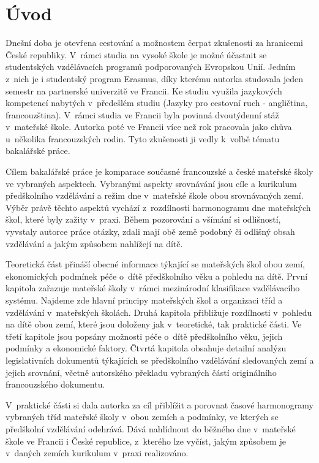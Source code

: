 \setcounter{page}{1}
\chapter*{Úvod}
Dnešní doba je otevřena cestování a možnostem čerpat zkušenosti za hranicemi České republiky. V~rámci studia na vysoké škole je možné účastnit se studentských vzdělávacích programů podporovaných Evropskou Unií. Jedním z~nich je i studentský program Erasmus, díky kterému autorka studovala jeden semestr na partnerské univerzitě ve Francii. Ke studiu využila jazykových kompetencí nabytých v~předešlém studiu (Jazyky pro cestovní ruch - angličtina, francouzština). V~rámci studia ve Francii byla povinná dvoutýdenní stáž v~mateřské škole. Autorka poté ve Francii více než rok pracovala jako chůva u~několika francouzských rodin. Tyto zkušenosti ji vedly k~volbě tématu bakalářské práce. 

Cílem bakalářské práce je komparace současné francouzské a české mateřské školy ve vybraných aspektech. Vybranými aspekty srovnávání jsou cíle a kurikulum předškolního vzdělávání a režim dne v mateřské škole obou srovnávaných zemí. Výběr právě těchto aspektů vychází z~rozdílnosti harmonogramu dne mateřských škol, které byly zažity v~praxi. Během pozorování a všímání si odlišností, vyvstaly autorce práce otázky, zdali mají obě země podobný či odlišný obsah vzdělávání a jakým způsobem nahlížejí na dítě. 

Teoretická část přináší obecné informace týkající se mateřských škol obou zemí, ekonomických podmínek péče o~dítě předškolního věku a pohledu na dítě. První kapitola zařazuje mateřské školy v~rámci mezinárodní klasifikace vzdělávacího systému. Najdeme zde hlavní principy mateřských škol a organizaci tříd a vzdělávání v~mateřských školách. Druhá kapitola přibližuje rozdílnosti v~pohledu na dítě obou zemí, které jsou doloženy jak v~teoretické, tak praktické části. Ve třetí kapitole jsou popsány možnosti péče o~dítě předškolního věku, jejich podmínky a ekonomické faktory. Čtvrtá kapitola obsahuje detailní analýzu legislativních dokumentů týkajících se předškolního vzdělávání sledovaných zemí a jejich srovnání, včetně autorského překladu vybraných částí originálního francouzského dokumentu.

V~praktické části si dala autorka za cíl přiblížit a porovnat časové harmonogramy vybraných tříd mateřské školy v~obou zemích a podmínky, ve kterých se předškolní vzdělávání odehrává. Dává nahlídnout do běžného dne v~mateřské škole ve Francii i České republice, z~kterého lze vyčíst, jakým způsobem je v~daných zemích kurikulum v~praxi realizováno.  